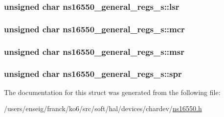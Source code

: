 \hypertarget{structns16550__general__regs__s_abea7b65ca4c70b2c53ba017e972a0900}{
\subsubsection[{lsr}]{\setlength{\rightskip}{0pt plus 5cm}unsigned char ns16550\-\_\-general\-\_\-regs\-\_\-s\-::lsr}}\label{structns16550__general__regs__s_abea7b65ca4c70b2c53ba017e972a0900}
\hypertarget{structns16550__general__regs__s_a2299b8cbe364949ee2c41e7d65705721}{
\subsubsection[{mcr}]{\setlength{\rightskip}{0pt plus 5cm}unsigned char ns16550\-\_\-general\-\_\-regs\-\_\-s\-::mcr}}\label{structns16550__general__regs__s_a2299b8cbe364949ee2c41e7d65705721}
\hypertarget{structns16550__general__regs__s_af314bb16382283a5bf82ce23bbe96631}{
\subsubsection[{msr}]{\setlength{\rightskip}{0pt plus 5cm}unsigned char ns16550\-\_\-general\-\_\-regs\-\_\-s\-::msr}}\label{structns16550__general__regs__s_af314bb16382283a5bf82ce23bbe96631}
\hypertarget{structns16550__general__regs__s_a6a65ab1a76ecbf50882ac8595d21bae7}{
\subsubsection[{spr}]{\setlength{\rightskip}{0pt plus 5cm}unsigned char ns16550\-\_\-general\-\_\-regs\-\_\-s\-::spr}}\label{structns16550__general__regs__s_a6a65ab1a76ecbf50882ac8595d21bae7}


The documentation for this struct was generated from the following file\-:\begin{DoxyCompactItemize}
\item 
/users/enseig/franck/ko6/src/soft/hal/devices/chardev/\hyperlink{ns16550_8h}{ns16550.\-h}\end{DoxyCompactItemize}
